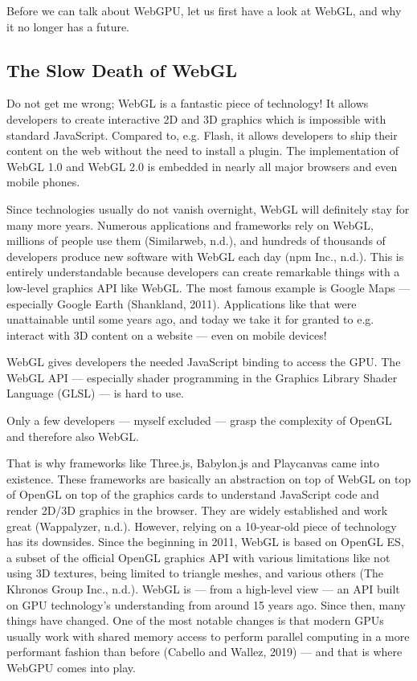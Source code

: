\documentclass[10pt]{article}
\begin{document}
\begin{sloppypar}
  Before we can talk about WebGPU, let us first have a look at WebGL, and why it no longer has a future.

  \subsection{The Slow Death of WebGL}
  \label{subsec:the-slow-death-of-webgl}

  Do not get me wrong; WebGL is a fantastic piece of technology! It allows developers to create interactive 2D and 3D graphics which is impossible with standard JavaScript. Compared to, e.g. Flash, it allows developers to ship their content on the web without the need to install a plugin. The implementation of WebGL 1.0 and WebGL 2.0 is embedded in nearly all major browsers and even mobile phones.

  Since technologies usually do not vanish overnight, WebGL will definitely stay for many more years. Numerous applications and frameworks rely on WebGL, millions of people use them (Similarweb, n.d.), and hundreds of thousands of developers produce new software with WebGL each day (npm Inc., n.d.). This is entirely understandable because developers can create remarkable things with a low-level graphics API like WebGL. The most famous example is Google Maps — especially Google Earth (Shankland, 2011). Applications like that were unattainable until some years ago, and today we take it for granted to e.g. interact with 3D content on a website — even on mobile devices!

  WebGL gives developers the needed JavaScript binding to access the GPU. The WebGL API — especially shader programming in the Graphics Library Shader Language (GLSL) — is hard to use.

  Only a few developers — myself excluded — grasp the complexity of OpenGL and therefore also WebGL.

  That is why frameworks like Three.js, Babylon.js and Playcanvas came into existence. These frameworks are basically an abstraction on top of WebGL on top of OpenGL on top of the graphics cards to understand JavaScript code and render 2D/3D graphics in the browser. They are widely established and work great (Wappalyzer, n.d.). However, relying on a 10-year-old piece of technology has its downsides. Since the beginning in 2011, WebGL is based on OpenGL ES, a subset of the official OpenGL graphics API with various limitations like not using 3D textures, being limited to triangle meshes, and various others (The Khronos Group Inc., n.d.). WebGL is — from a high-level view — an API built on GPU technology’s understanding from around 15 years ago. Since then, many things have changed. One of the most notable changes is that modern GPUs usually work with shared memory access to perform parallel computing in a more performant fashion than before (Cabello and Wallez, 2019) — and that is where WebGPU comes into play.


\end{sloppypar}
\end{document}
